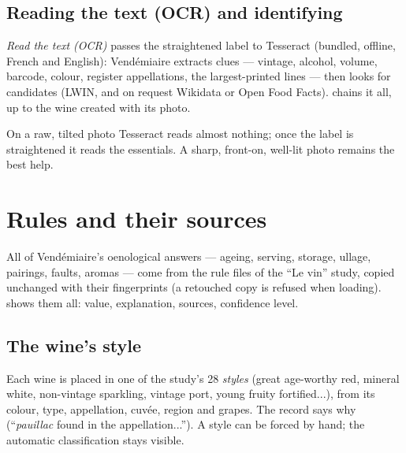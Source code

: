 \documentclass[11pt,a4paper]{article}
\begin{document}

\subsection{Reading the text (OCR) and identifying}
\emph{Read the text (OCR)} passes the straightened label to Tesseract (bundled, offline, French and English):
Vendémiaire extracts clues — vintage, alcohol, volume, barcode, colour, register appellations, the
largest-printed lines — then looks for candidates (LWIN, and on request Wikidata or Open Food Facts).
 chains it all, up to the wine created with its photo.


\begin{attention}
On a raw, tilted photo Tesseract reads almost nothing; once the label is straightened it reads the essentials.
A sharp, front-on, well-lit photo remains the best help.
\end{attention}

\section{Rules and their sources}
\label{sec:regles}
All of Vendémiaire's oenological answers — ageing, serving, storage, ullage, pairings, faults, aromas — come
from the rule files of the ``Le vin'' study, copied unchanged with their fingerprints (a retouched copy is
refused when loading).  shows them all: value,
explanation, sources, confidence level.


\subsection{The wine's style}
Each wine is placed in one of the study's 28 \emph{styles} (great age-worthy red, mineral white, non-vintage
sparkling, vintage port, young fruity fortified...), from its colour, type, appellation, cuvée, region and
grapes. The record says why (``\emph{pauillac} found in the appellation...''). A style can be forced by hand;
the automatic classification stays visible.
\end{document}
